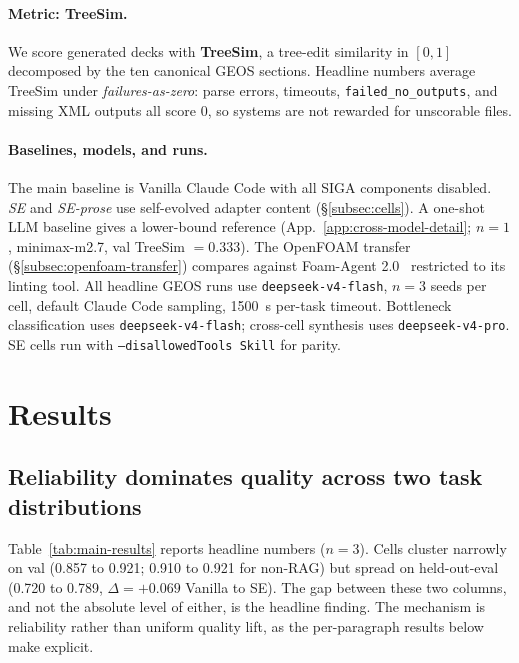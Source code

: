 \documentclass{article}
\begin{document}
\paragraph{Metric: TreeSim.}\label{subsec:metric} We score generated decks with \textbf{TreeSim}, a tree-edit similarity in $[0,1]$ decomposed by the ten canonical GEOS sections. Headline numbers average TreeSim under \emph{failures-as-zero}: parse errors, timeouts, \texttt{failed\_no\_outputs}, and missing XML outputs all score 0, so systems are not rewarded for unscorable files.

\paragraph{Baselines, models, and runs.}\label{subsec:baselines} The main baseline is Vanilla Claude Code with all SIGA components disabled. \emph{SE} and \emph{SE-prose} use self-evolved adapter content (\S\ref{subsec:cells}). A one-shot LLM baseline gives a lower-bound reference (App.~\ref{app:cross-model-detail}; $n=1$, minimax-m2.7, val TreeSim $=0.333$). The OpenFOAM transfer (\S\ref{subsec:openfoam-transfer}) compares against Foam-Agent 2.0~\citep{foamagent2025} restricted to its linting tool. All headline GEOS runs use \texttt{deepseek-v4-flash}, $n=3$ seeds per cell, default Claude Code sampling, 1500~s per-task timeout. Bottleneck classification uses \texttt{deepseek-v4-flash}; cross-cell synthesis uses \texttt{deepseek-v4-pro}. SE cells run with \texttt{--disallowedTools Skill} for parity.


\section{Results}
\label{sec:results}

\subsection{Reliability dominates quality across two task distributions}
\label{subsec:quality}

Table~\ref{tab:main-results} reports headline numbers ($n=3$). Cells cluster narrowly on val (0.857 to 0.921; 0.910 to 0.921 for non-RAG) but spread on held-out-eval (0.720 to 0.789, $\Delta = +0.069$ Vanilla to SE). The gap between these two columns, and not the absolute level of either, is the headline finding. The mechanism is reliability rather than uniform quality lift, as the per-paragraph results below make explicit.
\end{document}
